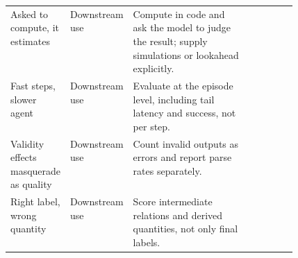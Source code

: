 \begin{table}[tbp]
\begin{tabularx}{\linewidth}{p{0.2\linewidth}p{0.12\linewidth}Xp{0.16\linewidth}}
Asked to compute, it estimates & Downstream use & Compute in code and ask the model to judge the result; supply simulations or lookahead explicitly. & \citep{arxiv2610_03935,arxiv2610_06354,arxiv2610_00376,arxiv2610_01834,arxiv2610_07730} \\
Fast steps, slower agent & Downstream use & Evaluate at the episode level, including tail latency and success, not per step. & \citep{arxiv2610_03935,arxiv2610_00437} \\
Validity effects masquerade as quality & Downstream use & Count invalid outputs as errors and report parse rates separately. & \citep{arxiv2609_26550} \\
Right label, wrong quantity & Downstream use & Score intermediate relations and derived quantities, not only final labels. & \citep{arxiv2609_24965} \\
\bottomrule
\end{tabularx}
\end{table}
